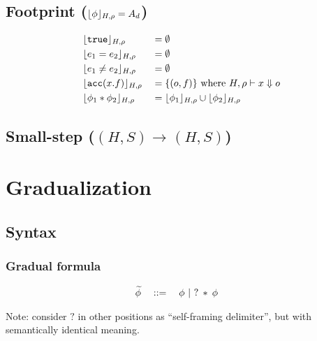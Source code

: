 \documentclass[11pt,a4paper]{article}
\begin{document}
\subsection{Footprint ($\dynamicFP {H} {\rho} {\phi} = A_d$)}
\begin{align*}
 &\dynamicFP {H} {\rho} {\true}    		&&= \emptyset
\\ &\dynamicFP {H} {\rho} {e_1 = e_2}     	&&= \emptyset
\\ &\dynamicFP {H} {\rho} {e_1 \neq e_2}  	&&= \emptyset
\\ &\dynamicFP {H} {\rho} {\acc(x.f)} 		&&= \{(o,f)\} \text{ where } \evale x o
\\ &\dynamicFP {H} {\rho} {\phi_1 * \phi_2} &&= \dynamicFP {H} {\rho} {\phi_1} \cup \dynamicFP {H} {\rho} {\phi_2}
\end{align*}

\newcommand{\dType}[4]{#1, #2 \vdash #3 : #4}

\newcommand{\sstepGeneric}[5]{({#1}, {#2}) \rightarrow^{#3} ({#4}, {#5})}
\newcommand{\sstep}[4]{\sstepGeneric {#1} {#2} {} {#3} {#4}}
\newcommand{\sstepM}[4]{\sstepGeneric {#1} {#2} * {#3} {#4}} 
\newcommand{\sstepWS}[4]{\sstepGeneric {#1} {{#2} \cdot S} {} {#3} {{#4} \cdot S}}
\newcommand{\sstepWSX}[8]{\sstepGeneric {#1} {({#2},{#3},{#4}) \cdot S} {} {#5} {({#6},{#7},{#8}) \cdot S}}

\newcommand{\Tfs}{\overline{T}~\overline{f}}
\subsection{Small-step ($\sstep H S H S$)}

%

\section{Gradualization}
\subsection{Syntax}
\subsubsection{Gradual formula}
\begin{align*}
&\grad{\phi} \quad ::= \quad \phi ~|~ \withqm{\phi}
\end{align*}

Note: consider $?$ in other positions as ``self-framing delimiter'', but with semantically identical meaning.
\end{document}
